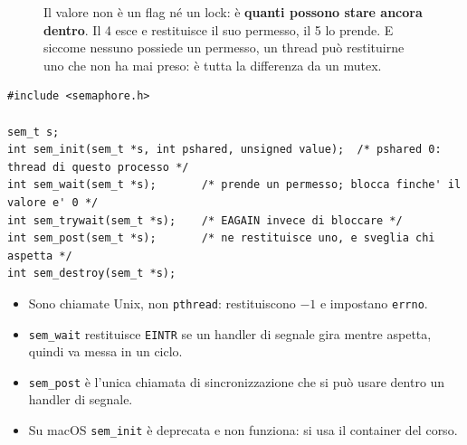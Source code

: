 \begin{figure}[H]
\centering
{}
\caption{Il valore non è un flag né un lock: è \textbf{quanti possono stare ancora dentro}. Il 4 esce e restituisce il suo permesso, il 5 lo prende. E siccome nessuno possiede un
         permesso, un thread può restituirne uno che non ha mai preso: è tutta la differenza da un mutex.}
\end{figure}

\begin{lstlisting}[language={[POSIX]C}, style=wnumbers, title={I semafori POSIX}]
#include <semaphore.h>

sem_t s;
int sem_init(sem_t *s, int pshared, unsigned value);  /* pshared 0: thread di questo processo */
int sem_wait(sem_t *s);       /* prende un permesso; blocca finche' il valore e' 0 */
int sem_trywait(sem_t *s);    /* EAGAIN invece di bloccare */
int sem_post(sem_t *s);       /* ne restituisce uno, e sveglia chi aspetta */
int sem_destroy(sem_t *s);
\end{lstlisting}

\begin{itemize}
    \item Sono chiamate Unix, non \texttt{pthread}: restituiscono $-1$ e impostano \texttt{errno}.
    \item \texttt{sem\_wait} restituisce \texttt{EINTR} se un handler di segnale gira mentre aspetta, quindi va messa in un
          ciclo.
    \item \texttt{sem\_post} è l'unica chiamata di sincronizzazione che si può usare dentro un handler di segnale.
    \item Su macOS \texttt{sem\_init} è deprecata e non funziona: si usa il container del corso.
\end{itemize}


